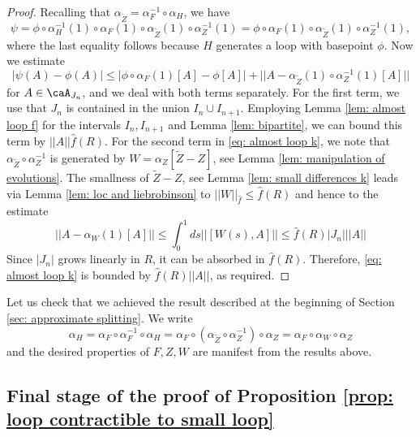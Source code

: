 \begin{proof}
	Recalling that $\alpha_{\widetilde Z}=\alpha_{F}^{-1} \circ \alpha_H$, we have
	$$\psi= \phi \circ \alpha_{H}^{-1}(1) \circ \alpha_{F}(1) \circ \alpha_{\widetilde Z}(1) \circ 
	\alpha_{Z}^{-1}(1)= \phi \circ \alpha_{F}(1) \circ \alpha_{\widetilde Z}(1) \circ 
	\alpha_{Z}^{-1}(1),
	$$
	where the last equality follows because $H$ generates a loop with basepoint $\phi$. 
	Now we estimate
	\begin{equation}\label{eq: almost loop k}
		|\psi(A)-\phi(A)| \leq    |\phi \circ \alpha_{F}(1)[A]-\phi[A]| +   ||  A- \alpha_{\widetilde Z}(1) \circ 
		\alpha_{Z}^{-1}(1)[A] ||
	\end{equation}
	for $A\in\caA_{J_n}$, and we deal with both terms separately. For the first term, we use that $J_n$ is contained in the union $I_n \cup I_{n+1}$. Employing Lemma  \ref{lem: almost loop f} for the intervals $I_n,I_{n+1}$ and Lemma \ref{lem: bipartite}, we can bound this term by $||A || \hat{f}(R)$.
	For the second term in \eqref{eq: almost loop k}, we note that $\alpha_{\widetilde Z} \circ 
	\alpha_{Z}^{-1}$ is generated by $W= \alpha_Z[\widetilde Z - Z]$, see Lemma \ref{lem: manipulation of evolutions}. The smallness of $\widetilde Z - Z$, see Lemma 
	\ref{lem: small differences k} leads via Lemma \ref{lem: loc and liebrobinson} to  $||W||_{\hat{f}}\leq \hat{f}(R)$ and hence  to the estimate
	$$
	||  A- \alpha_{W}(1)[A] || \leq \int_0^1 ds  ||  [W(s), A]||  \leq    \hat{f}(R)  |J_n| || A ||
	$$
	Since $|J_n|$ grows linearly in $R$, it can be absorbed in $\hat{f}(R)$. Therefore, \eqref{eq: almost loop k} is bounded by $\hat{f}(R) ||A||$, as required. 
\end{proof}

Let us check that we achieved the result described at the beginning of Section \ref{sec: approximate splitting}. We write
\begin{equation}\label{First Splitting Loop}
	\alpha_H=   \alpha_{F} \circ  \alpha_{F}^{-1} \circ \alpha_H = \alpha_{F} \circ  \left(\alpha_{\widetilde Z} \circ \alpha^{-1}_Z\right) \circ \alpha_Z =  \alpha_{F} \circ  \alpha_{W} \circ \alpha_Z
\end{equation}
and the desired properties of  $F,Z,W$ are manifest from the results above. 




\subsection{Final stage of the proof of Proposition \ref{prop: loop contractible to small loop}} \label{sec: final stage proof}


